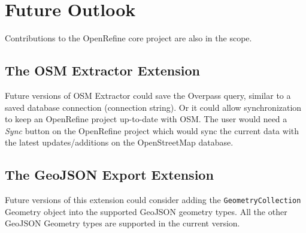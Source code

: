\section*{Future Outlook}
Contributions to the OpenRefine core project are also in the scope.
\subsection*{The OSM Extractor Extension}
Future versions of OSM Extractor could save the
Overpass query, similar to a saved database connection (connection string). Or it
could allow synchronization to keep an OpenRefine
project up-to-date with OSM. The user would need a \textit{Sync} button on the OpenRefine project which would sync the current data with the latest updates/additions on the OpenStreetMap database.
\subsection*{The GeoJSON Export Extension}
Future versions of this extension could consider adding the  \texttt{GeometryCollection} Geometry object
into the supported GeoJSON geometry types. All the other GeoJSON Geometry types are supported in the current version.